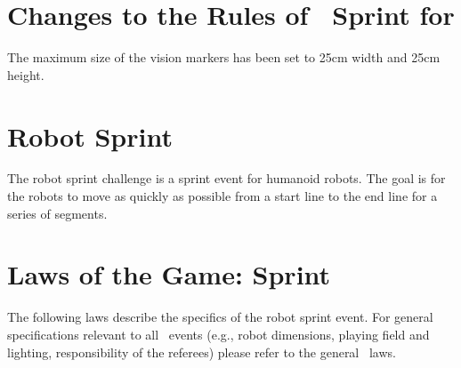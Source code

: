 \documentclass[12pt]{hurocup}
\begin{document}
\section*{Changes to the Rules of \HuroCup\ Sprint for \thisyear}

The maximum size of the vision markers has been set to 25cm width and
25cm height.

\newpage

\section{Robot Sprint}
\label{sec:robot-sprint}

The robot sprint challenge is a sprint event for humanoid robots. The
goal is for the robots to move as quickly as possible from a start
line to the end line for a series of segments.

\section{Laws of the Game: Sprint}
\label{sec:laws-sprint}

The following laws describe the specifics of the robot sprint event. For
general specifications relevant to all \HuroCup\ events (e.g., robot
dimensions, playing field and lighting, responsibility of the
referees) please refer to the general \HuroCup\ laws.

\label{law:field-of-play}
\end{document}
